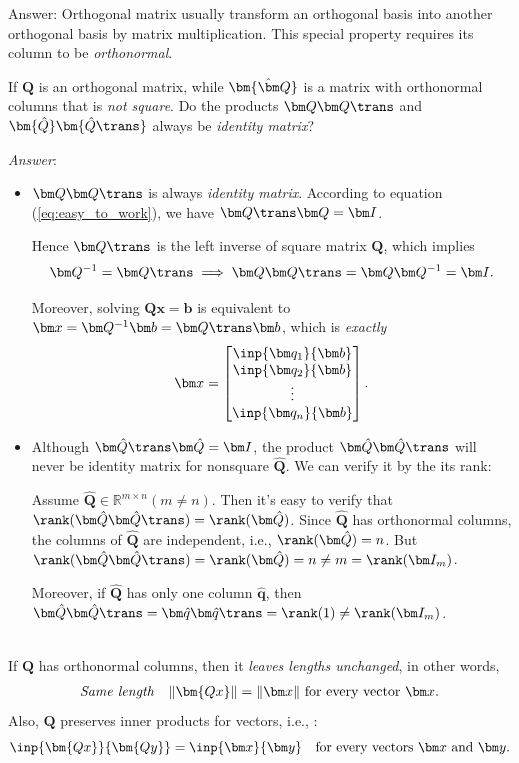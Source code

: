 Answer: Orthogonal matrix usually transform an orthogonal basis into another orthogonal basis by matrix multiplication. This special property requires its column to be \emph{orthonormal}.
\begin{example}

If $\bm Q$ is an orthogonal matrix, while $\bm{\hat\bm Q}$ is a matrix with orthonormal columns that is \emph{not square}. Do the products $\bm Q\bm Q\trans$ and $\bm{\hat Q}\bm{\hat Q\trans}$ always be \textit{identity matrix}?

\textit{Answer}:
\begin{itemize}
\item
$\bm Q\bm Q\trans$ is always \textit{identity matrix}. According to equation (\ref{eq:easy_to_work}), we have $\bm Q\trans\bm Q=\bm I$.

Hence $\bm Q\trans$ is the left inverse of square matrix $\bm Q$, which implies 
\[
\bm Q^{-1}=\bm Q\trans\implies\bm Q\bm Q\trans=\bm Q\bm Q^{-1}=\bm I.
\]

Moreover, solving $\bm{Qx}=\bm b$ is equivalent to $\bm x=\bm Q^{-1}\bm b=\bm Q\trans\bm b$, which is \textit{exactly} 
\[
\bm x=\begin{bmatrix}
\inp{\bm q_1}{\bm b}\\\inp{\bm q_2}{\bm b}\\\vdots\\\inp{\bm q_n}{\bm b}
\end{bmatrix}.
\]
\item
Although $\bm \hat Q\trans\bm \hat Q=\bm I$, the  product $\bm \hat Q\bm \hat Q\trans$ will never be identity matrix for nonsquare $\bm\hat Q$. We can verify it by the its rank:

Assume $\bm \hat Q\in\mathbb{R}^{m\times n} (m\ne n)$. Then it's easy to verify that $\rank(\bm \hat Q\bm \hat Q\trans)=\rank(\bm\hat Q)$. Since $\bm\hat Q$ has orthonormal columns, the columns of $\bm\hat Q$ are independent, i.e., $\rank(\bm\hat Q)=n$. But $\rank(\bm \hat Q\bm \hat Q\trans)=\rank(\bm\hat Q)=n\ne m=\rank(\bm I_{m})$.

Moreover, if $\bm\hat Q$ has only one column $\bm\hat q$, then $\bm \hat Q\bm \hat Q\trans=\bm\hat q\bm\hat q\trans=\rank(1)\ne \rank(\bm I_{m})$.
\end{itemize}
\end{example}
\begin{proposition}\quad\\
If $\bm Q$ has orthonormal columns, then it \textit{leaves lengths unchanged}, in other words,
\[
\begin{array}{ll}
\mbox{\emph{Same length}}
&
\|\bm{Qx}\|=\|\bm x\|\mbox{ for every vector $\bm x$.}
\end{array}
\]
Also, $\bm Q$ preserves inner products for vectors, i.e., :
\[
\inp{\bm{Qx}}{\bm{Qy}}=\inp{\bm x}{\bm y}\quad\text{for every vectors $\bm x$ and $\bm y$.}
\]
\end{proposition}
